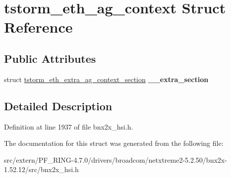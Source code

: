 \hypertarget{structtstorm__eth__ag__context}{
\section{tstorm\_\-eth\_\-ag\_\-context Struct Reference}
\label{structtstorm__eth__ag__context}
}
\subsection*{Public Attributes}
\begin{DoxyCompactItemize}
\item 
\hypertarget{structtstorm__eth__ag__context_a4e3e41650a44e49ab242af2d24bf67da}{
struct \hyperlink{structtstorm__eth__extra__ag__context__section}{tstorm\_\-eth\_\-extra\_\-ag\_\-context\_\-section} {\bfseries \_\-\_\-extra\_\-section}}
\label{structtstorm__eth__ag__context_a4e3e41650a44e49ab242af2d24bf67da}

\end{DoxyCompactItemize}


\subsection{Detailed Description}


Definition at line 1937 of file bnx2x\_\-hsi.h.



The documentation for this struct was generated from the following file:\begin{DoxyCompactItemize}
\item 
src/extern/PF\_\-RING-\/4.7.0/drivers/broadcom/netxtreme2-\/5.2.50/bnx2x-\/1.52.12/src/bnx2x\_\-hsi.h\end{DoxyCompactItemize}
